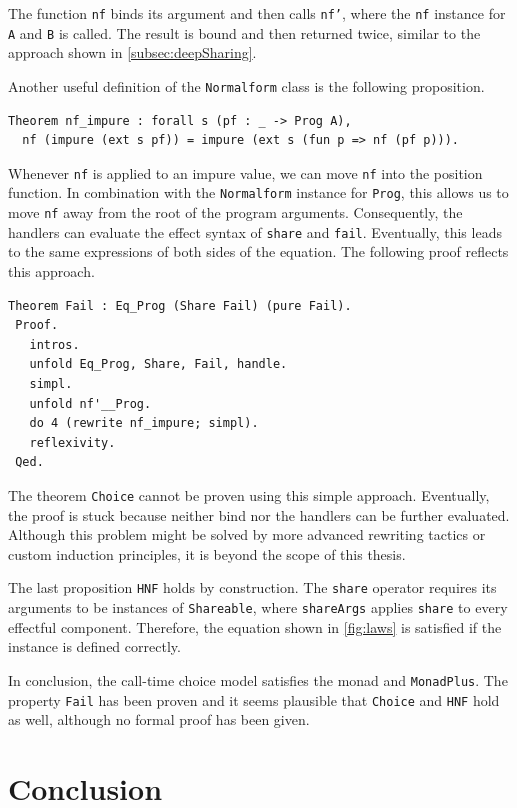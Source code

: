 \documentclass[a4paper, 11pt, fleqn, twoside]{scrreprt}
\newcommand{\hinl}[1]{\texttt{#1}}
\newcommand{\cinl}[1]{\texttt{#1}}
\begin{document}
The function \cinl{nf} binds its argument and then calls \cinl{nf'}, where the \cinl{nf} instance for \cinl{A} and \cinl{B} is called.
The result is bound and then returned twice, similar to the approach shown in \autoref{subsec:deepSharing}.

Another useful definition of the \cinl{Normalform} class is the following proposition.

\begin{verbatim}
Theorem nf_impure : forall s (pf : _ -> Prog A),
  nf (impure (ext s pf)) = impure (ext s (fun p => nf (pf p))).
\end{verbatim}

Whenever \cinl{nf} is applied to an impure value, we can move \cinl{nf} into the position function.
In combination with the \cinl{Normalform} instance for \cinl{Prog}, this allows us to move \cinl{nf} away from the root of the program arguments.
Consequently, the handlers can evaluate the effect syntax of \cinl{share} and \cinl{fail}.
Eventually, this leads to the same expressions of both sides of the equation.
The following proof reflects this approach.

\begin{verbatim}
Theorem Fail : Eq_Prog (Share Fail) (pure Fail).
 Proof.
   intros.
   unfold Eq_Prog, Share, Fail, handle.
   simpl.
   unfold nf'__Prog.
   do 4 (rewrite nf_impure; simpl).
   reflexivity.
 Qed.
\end{verbatim}

The theorem \cinl{Choice} cannot be proven using this simple approach.
Eventually, the proof is stuck because neither bind nor the handlers can be further evaluated.
Although this problem might be solved by more advanced rewriting tactics or custom induction principles, it is beyond the scope of this thesis.

The last proposition \cinl{HNF} holds by construction.
The \cinl{share} operator requires its arguments to be instances of \cinl{Shareable}, where \cinl{shareArgs} applies \cinl{share} to every effectful component.
Therefore, the equation shown in \autoref{fig:laws} is satisfied if the instance is defined correctly.

In conclusion, the call-time choice model satisfies the monad and \hinl{MonadPlus}.
The property \cinl{Fail} has been proven and it seems plausible that \cinl{Choice} and \cinl{HNF} hold as well, although no formal proof has been given.

\chapter{Conclusion}
\label{ch:conclusion}
\end{document}
